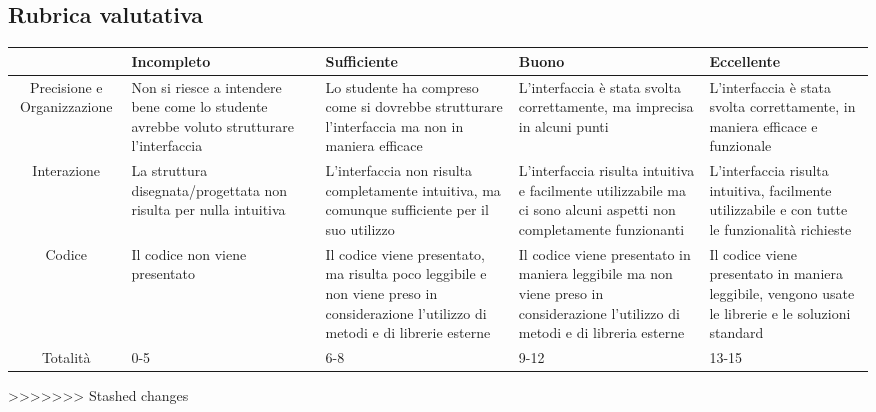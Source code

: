   \subsection{Rubrica valutativa}
  \begin{center}
    \begin{tabular}{|c|p{2.5cm}|p{2.5cm}|p{2.5cm}|p{2.5cm}|}
      \hline
      & Incompleto & Sufficiente & Buono & Eccellente \\
      \hline
      Precisione e Organizzazione & Non si riesce a intendere bene come lo studente avrebbe voluto strutturare l'interfaccia & Lo studente ha compreso come si dovrebbe strutturare l'interfaccia ma non in maniera efficace & L'interfaccia è stata svolta correttamente, ma imprecisa in alcuni punti & L'interfaccia è stata svolta correttamente, in maniera efficace e funzionale \\
      \hline
      Interazione & La struttura disegnata/progettata non risulta per nulla intuitiva & L'interfaccia non risulta completamente intuitiva, ma comunque sufficiente per il suo utilizzo & L'interfaccia risulta intuitiva e facilmente utilizzabile ma ci sono alcuni aspetti non completamente funzionanti & L'interfaccia risulta intuitiva, facilmente utilizzabile e con tutte le funzionalità richieste \\
      \hline
      Codice & Il codice non viene presentato & Il codice viene presentato, ma risulta poco leggibile e non viene preso in considerazione l'utilizzo di metodi e di librerie esterne & Il codice viene presentato in maniera leggibile ma non viene preso in considerazione l'utilizzo di metodi e di libreria esterne & Il codice viene presentato in maniera leggibile, vengono usate le librerie e le soluzioni standard \\
      \hline
      Totalità & 0-5 & 6-8 & 9-12 & 13-15 \\
      \hline
    \end{tabular}
    \end{center}
>>>>>>> Stashed changes
